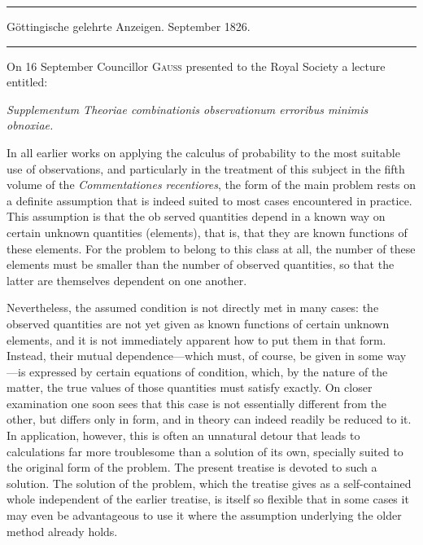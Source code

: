 \par\bigskip
\begin{center}
\rule{.88\textwidth}{.3pt}\par
Göttingische gelehrte Anzeigen. September 1826.\par
\rule{.88\textwidth}{.3pt}
\end{center}

On 16 September Councillor \textsc{Gauss} presented to the Royal Society a lecture entitled:
\begin{center}
\textit{Supplementum Theoriae combinationis observationum erroribus minimis obnoxiae.}
\end{center}
\noindent In all earlier works on applying the calculus of probability to the most suitable use of observations, and particularly in the treatment of this subject in the fifth volume of the \textit{Commentationes recentiores}, the form of the main problem rests on a definite assumption that is indeed suited to most cases encountered in practice. This assumption is that the ob%
served quantities depend in a known way on certain unknown quantities (elements), that is, that they are known functions of these elements. For the problem to belong to this class at all, the number of these elements must be smaller than the number of observed quantities, so that the latter are themselves dependent on one another.

Nevertheless, the assumed condition is not directly met in many cases: the observed quantities are not yet given as known functions of certain unknown elements, and it is not immediately apparent how to put them in that form. Instead, their mutual dependence—which must, of course, be given in some way—is expressed by certain equations of condition, which, by the nature of the matter, the true values of those quantities must satisfy exactly. On closer examination one soon sees that this case is not essentially different from the other, but differs only in form, and in theory can indeed readily be reduced to it. In application, however, this is often an unnatural detour that leads to calculations far more troublesome than a solution of its own, specially suited to the original form of the problem. The present treatise is devoted to such a solution. The solution of the problem, which the treatise gives as a self-contained whole independent of the earlier treatise, is itself so flexible that in some cases it may even be advantageous to use it where the assumption underlying the older method already holds.

